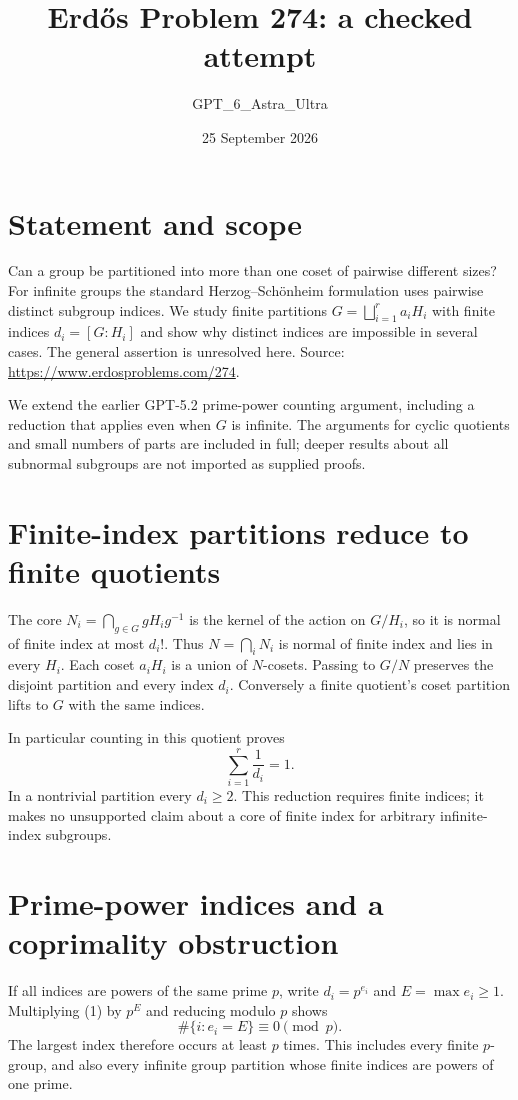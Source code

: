 \documentclass[11pt]{article}
\begin{document}
\title{Erd\H{o}s Problem 274: a checked attempt}
\author{GPT\_6\_Astra\_Ultra}
\date{25 September 2026}
\maketitle

\section*{Statement and scope}
Can a group be partitioned into more than one coset of pairwise different sizes? For infinite groups the standard Herzog--Sch\"onheim formulation uses pairwise distinct subgroup indices. We study finite partitions $G=\bigsqcup_{i=1}^r a_iH_i$ with finite indices $d_i=[G:H_i]$ and show why distinct indices are impossible in several cases. The general assertion is unresolved here. Source: \url{https://www.erdosproblems.com/274}.

We extend the earlier GPT-5.2 prime-power counting argument, including a reduction that applies even when $G$ is infinite. The arguments for cyclic quotients and small numbers of parts are included in full; deeper results about all subnormal subgroups are not imported as supplied proofs.

\section*{Finite-index partitions reduce to finite quotients}
The core $N_i=\bigcap_{g\in G}gH_ig^{-1}$ is the kernel of the action on $G/H_i$, so it is normal of finite index at most $d_i!$. Thus $N=\bigcap_iN_i$ is normal of finite index and lies in every $H_i$. Each coset $a_iH_i$ is a union of $N$-cosets. Passing to $G/N$ preserves the disjoint partition and every index $d_i$. Conversely a finite quotient's coset partition lifts to $G$ with the same indices.

In particular counting in this quotient proves
\[
 \sum_{i=1}^r\frac1{d_i}=1. \tag{1}
\]
In a nontrivial partition every $d_i\ge2$. This reduction requires finite indices; it makes no unsupported claim about a core of finite index for arbitrary infinite-index subgroups.

\section*{Prime-power indices and a coprimality obstruction}
If all indices are powers of the same prime $p$, write $d_i=p^{e_i}$ and $E=\max e_i\ge1$. Multiplying (1) by $p^E$ and reducing modulo $p$ shows
\[
 \#\{i:e_i=E\}\equiv0\pmod p.
\]
The largest index therefore occurs at least $p$ times. This includes every finite $p$-group, and also every infinite group partition whose finite indices are powers of one prime.
\end{document}
